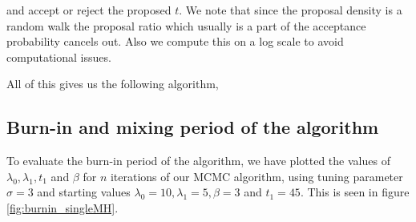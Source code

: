 and accept or reject the proposed $t$. We note that since the proposal density is a random walk the proposal ratio which usually is a part of the acceptance probability cancels out. Also we compute this on a log scale to avoid computational issues.

All of this gives us the following algorithm, 



\subsection{Burn-in and mixing period of the algorithm}

To evaluate the burn-in period of the algorithm, we have plotted the values of $\lambda_0, \lambda_1, t_1$ and $\beta$ for $n$ iterations of our MCMC algorithm, using tuning parameter $\sigma = 3$ and starting values $\lambda_0 = 10, \lambda_1 = 5, \beta = 3$ and $t_1 = 45$. This is seen in figure \ref{fig:burnin_singleMH}. 


